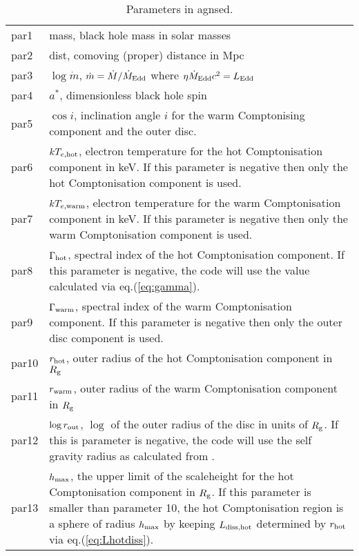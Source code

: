 \documentclass[a4paper,fleqn,usenatbib]{mnras}
\begin{document}
\begin{table}
	\centering
	\caption{Parameters in {\sc agnsed}. }
	\label{tab:appendix}
	\begin{tabular}{lp{7cm}} 
		\hline
par1 &mass, black hole mass in solar masses\\
par2 &dist, comoving (proper) distance in Mpc\\
par3 & $\log\dot{m}$, $\dot{m}=\dot{M}/\dot{M}_{\rm Edd}$ where $\eta\dot{M}_{\rm Edd}c^2=L_{\rm Edd}$\\
par4 & $a^\ast$, dimensionless black hole spin\\
par5 & $\cos i$, inclination angle $i$ for the warm Comptonising component and the outer disc.\\
par6 & $kT_{e,\rm hot}$, electron temperature for the hot Comptonisation component in keV.
If this parameter is negative then only the hot Comptonisation component is used. \\
par7 & $kT_{e,\rm warm}$, electron temperature for the warm Comptonisation component in keV.
If this parameter is negative then only the warm Comptonisation component is used. \\
par8 & $\Gamma_{\rm hot}$, spectral index of the hot Comptonisation component.
If this parameter is negative, the code will use the value calculated via eq.(\ref{eq:gamma}). \\
par9 & $\Gamma_{\rm warm}$, spectral index of the warm Comptonisation component.
If this parameter is negative then only the outer disc component is used. \\
par10 &  $r_{\rm hot}$, outer radius of the hot Comptonisation component in $R_{\rm g}$\\
par11 & $r_{\rm warm}$, outer radius of the warm Comptonisation component in $R_{\rm g}$\\
par12 & $\log r_{\rm out}$, $\log$ of the outer radius of the disc in units of $R_{\rm g}$. 
If this is parameter is negative, the code will use the self gravity radius as calculated from \cite{laor1989}.\\
par13 & $h_{\rm max}$, the upper limit of the scaleheight for the hot Comptonisation component in $R_{\rm g}$. If this parameter is smaller than parameter 10, the hot Comptonisation region is a sphere of radius $h_{\rm max}$ by keeping $L_{\rm diss, hot}$ determined by $r_{\rm hot}$ via eq.(\ref{eq:Lhotdiss}).\\

\end{tabular}
\end{table}
\end{document}
